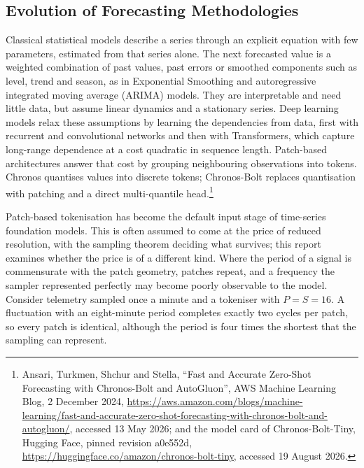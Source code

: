 \subsection*{Evolution of Forecasting Methodologies}
Classical statistical models describe a series through an explicit equation with few parameters, estimated from that series alone. The next forecasted value is a weighted combination of past values, past errors or smoothed components such as level, trend and season, as in Exponential Smoothing and autoregressive integrated moving average (ARIMA) models\autocite[chs.~8\textendash{}9]{hyndmanForecastingPrinciplesPractice2021}. They are interpretable and need little data, but assume linear dynamics and a stationary series. Deep learning models relax these assumptions by learning the dependencies from data, first with recurrent and convolutional networks and then with Transformers, which capture long-range dependence at a cost quadratic in sequence length\autocite{vaswaniAttentionAllYou2017,wangDeepTimeSeries2026}. Patch-based architectures answer that cost by grouping neighbouring observations into tokens\autocite{nieTimeSeriesWorth2023}. Chronos quantises values into discrete tokens\autocite{ansariChronosLearningLanguage2024}; Chronos-Bolt replaces quantisation with patching and a direct multi-quantile head\autocite{ansariChronosLearningLanguage2024a}.\footnote{\label{fn:chronosBolt}Ansari, Turkmen, Shchur and Stella, ``Fast and Accurate Zero-Shot Forecasting with Chronos-Bolt and AutoGluon'', AWS Machine Learning Blog, 2 December 2024, \url{https://aws.amazon.com/blogs/machine-learning/fast-and-accurate-zero-shot-forecasting-with-chronos-bolt-and-autogluon/}, accessed 13 May 2026; and the model card of Chronos-Bolt-Tiny, Hugging Face, pinned revision a0e552d, \url{https://huggingface.co/amazon/chronos-bolt-tiny}, accessed 19 August 2026.}

Patch-based tokenisation has become the default input stage of time-series foundation models. This is often assumed to come at the price of reduced resolution, with the sampling theorem deciding what survives; this report examines whether the price is of a different kind. Where the period of a signal is commensurate with the patch geometry, patches repeat, and a frequency the sampler represented perfectly may become poorly observable to the model. Consider telemetry sampled once a minute and a tokeniser with $P=S=16$. A fluctuation with an eight-minute period completes exactly two cycles per patch, so every patch is identical, although the period is four times the shortest that the sampling can represent.

